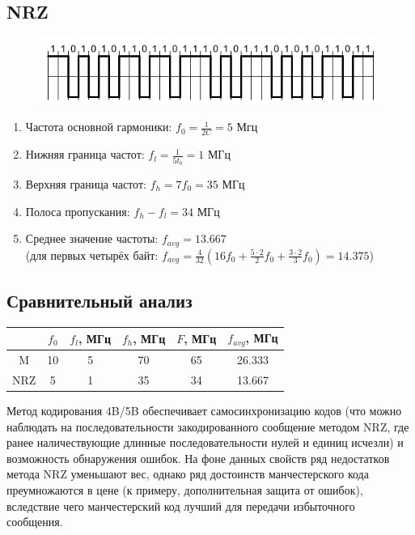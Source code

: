 \documentclass[12pt, a4paper] {ncc}
\begin{document}
	\subsection*{NRZ}
		\begin{figure}[h!]
			\includegraphics{../img/NRZLog.png}
		\end{figure}
		\begin{enumerate}
			\item Частота основной гармоники: $f_0 = \frac {1} {2C} = 5$ Мгц
			 \item Нижняя граница частот: $f_l = \frac {1} {5t_b} = 1$ МГц
			\item Верхняя граница частот: $f_h = 7f_0 = 35$ МГц 
 			\item Полоса пропускания: $f_h - f_l = 34$ МГц 
			\item Среднее значение частоты: $f_{avg} = 13.667$ \\
				  (для первых четырёх байт: $f_{avg} = \frac {4} {32} (16f_0 + \frac {5 \cdot 2} {2} f_0 + \frac {3 \cdot 2} {3} f_0) = 14.375$)
		\end{enumerate}
	\subsection*{Сравнительный анализ}
    \begin{table}[!h]
        \begin{tabular}{|c|c|c|c|c|c|}
            \hline
                & $f_0$ & $f_l$, МГц & $f_h$, МГц & $F$, МГц & $f_{avg}$, МГц \\ \hline
            M   & 10    & 5          & 70         & 65       &  26.333        \\ \hline
            NRZ & 5     & 1          & 35         & 34       &  13.667        \\ \hline
        \end{tabular}
    \end{table}

	Метод кодирования 4B/5B обеспечивает самосинхронизацию кодов (что можно наблюдать на последовательности
	закодированного сообщение методом NRZ, где ранее наличествующие длинные последовательности нулей и единиц
	исчезли) и возможность обнаружения ошибок. На фоне данных свойств ряд недостатков метода NRZ
	уменьшают вес, однако ряд достоинств манчестерского кода преумножаются в цене (к примеру, дополнительная защита от ошибок),
	вследствие чего манчестерский код лучший для передачи избыточного сообщения.
\end{document}
